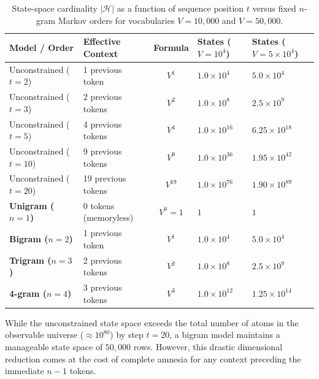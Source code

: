 \documentclass[../../main.tex]{subfiles}
\begin{document}
\begin{table}[htbp]
\centering
\small
\caption{State-space cardinality $|\mathcal{H}|$ as a function of sequence position $t$ versus fixed $n$-gram Markov orders for vocabularies $V = 10{,}000$ and $V = 50{,}000$.}
\label{tab:state_space_reduction}
\begin{tabularx}{\textwidth}{l l c >{\raggedleft\arraybackslash}X >{\raggedleft\arraybackslash}X}
\toprule
\textbf{Model / Order} & \textbf{Effective Context} & \textbf{Formula} & \textbf{States ($V = 10^4$)} & \textbf{States ($V = 5 \times 10^4$)} \\
\midrule
Unconstrained ($t=2$)  & 1 previous token   & $V^1$       & $1.0 \times 10^4$    & $5.0 \times 10^4$    \\
Unconstrained ($t=3$)  & 2 previous tokens  & $V^2$       & $1.0 \times 10^8$    & $2.5 \times 10^9$    \\
Unconstrained ($t=5$)  & 4 previous tokens  & $V^4$       & $1.0 \times 10^{16}$ & $6.25 \times 10^{18}$ \\
Unconstrained ($t=10$) & 9 previous tokens  & $V^9$       & $1.0 \times 10^{36}$ & $1.95 \times 10^{42}$ \\
Unconstrained ($t=20$) & 19 previous tokens & $V^{19}$     & $1.0 \times 10^{76}$ & $1.90 \times 10^{89}$ \\
\midrule
\textbf{Unigram ($n=1$)} & 0 tokens (memoryless) & $V^0 = 1$   & $1$                  & $1$                  \\
\textbf{Bigram ($n=2$)}  & 1 previous token      & $V^1$       & $1.0 \times 10^4$    & $5.0 \times 10^4$    \\
\textbf{Trigram ($n=3$)} & 2 previous tokens     & $V^2$       & $1.0 \times 10^8$    & $2.5 \times 10^9$    \\
\textbf{4-gram ($n=4$)}  & 3 previous tokens     & $V^3$       & $1.0 \times 10^{12}$ & $1.25 \times 10^{14}$ \\
\bottomrule
\end{tabularx}
\end{table}

While the unconstrained state space exceeds the total number of atoms in the observable universe ($\approx 10^{80}$) by step $t=20$, a bigram model maintains a manageable state space of $50{,}000$ rows. However, this drastic dimensional reduction comes at the cost of complete amnesia for any context preceding the immediate $n-1$ tokens.
\end{document}
